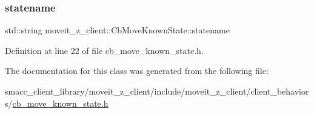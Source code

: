 \subsubsection{\texorpdfstring{statename}{statename}}
{\footnotesize\ttfamily std\+::string moveit\+\_\+z\+\_\+client\+::\+Cb\+Move\+Known\+State\+::statename}



Definition at line 22 of file cb\+\_\+move\+\_\+known\+\_\+state.\+h.



The documentation for this class was generated from the following file\+:\begin{DoxyCompactItemize}
\item 
smacc\+\_\+client\+\_\+library/moveit\+\_\+z\+\_\+client/include/moveit\+\_\+z\+\_\+client/client\+\_\+behaviors/\hyperlink{cb__move__known__state_8h}{cb\+\_\+move\+\_\+known\+\_\+state.\+h}\end{DoxyCompactItemize}
